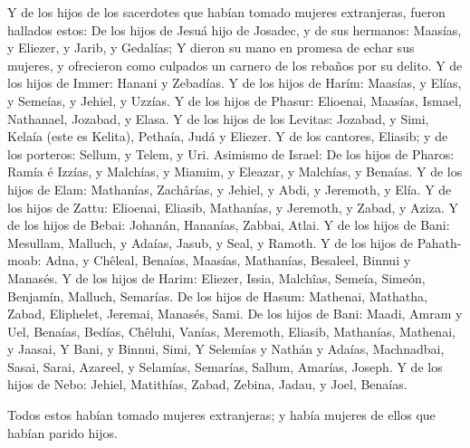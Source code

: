  Y de los hijos de los sacerdotes que habían tomado mujeres
extranjeras, fueron hallados estos: De los hijos de Jesuá hijo de
Josadec, y de sus hermanos: Maasías, y Eliezer, y Jarib, y Gedalías;
 Y dieron su mano en promesa de echar sus mujeres, y
ofrecieron como culpados un carnero de los rebaños por su delito.
 Y de los hijos de Immer: Hanani y Zebadías. 
Y de los hijos de Harím: Maasías, y Elías, y Semeías, y Jehiel, y
Uzzías.  Y de los hijos de Phasur: Elioenai, Maasías,
Ismael, Nathanael, Jozabad, y Elasa.  Y de los hijos de los
Levitas: Jozabad, y Simi, Kelaía (este es Kelita), Pethaía, Judá y
Eliezer.  Y de los cantores, Eliasib; y de los porteros:
Sellum, y Telem, y Uri.  Asimismo de Israel: De los hijos
de Pharos: Ramía é Izzías, y Malchías, y Miamim, y Eleazar, y Malchías,
y Benaías.  Y de los hijos de Elam: Mathanías, Zachârías, y
Jehiel, y Abdi, y Jeremoth, y Elía.  Y de los hijos de
Zattu: Elioenai, Eliasib, Mathanías, y Jeremoth, y Zabad, y Aziza.
 Y de los hijos de Bebai: Johanán, Hananías, Zabbai, Atlai.
 Y de los hijos de Bani: Mesullam, Malluch, y Adaías,
Jasub, y Seal, y Ramoth.  Y de los hijos de Pahath-moab:
Adna, y Chêleal, Benaías, Maasías, Mathanías, Besaleel, Binnui y
Manasés.  Y de los hijos de Harim: Eliezer, Issia,
Malchîas, Semeía, Simeón,  Benjamín, Malluch, Semarías.
 De los hijos de Hasum: Mathenai, Mathatha, Zabad,
Eliphelet, Jeremai, Manasés, Sami.  De los hijos de Bani:
Maadi, Amram y Uel,  Benaías, Bedías, Chêluhi,
 Vanías, Meremoth, Eliasib,  Mathanías,
Mathenai, y Jaasai,  Y Bani, y Binnui, Simi, 
Y Selemías y Nathán y Adaías,  Machnadbai, Sasai, Sarai,
 Azareel, y Selamías, Semarías,  Sallum,
Amarías, Joseph.  Y de los hijos de Nebo: Jehiel,
Matithías, Zabad, Zebina, Jadau, y Joel, Benaías.

 Todos estos habían tomado mujeres extranjeras; y había
mujeres de ellos que habían parido hijos.
